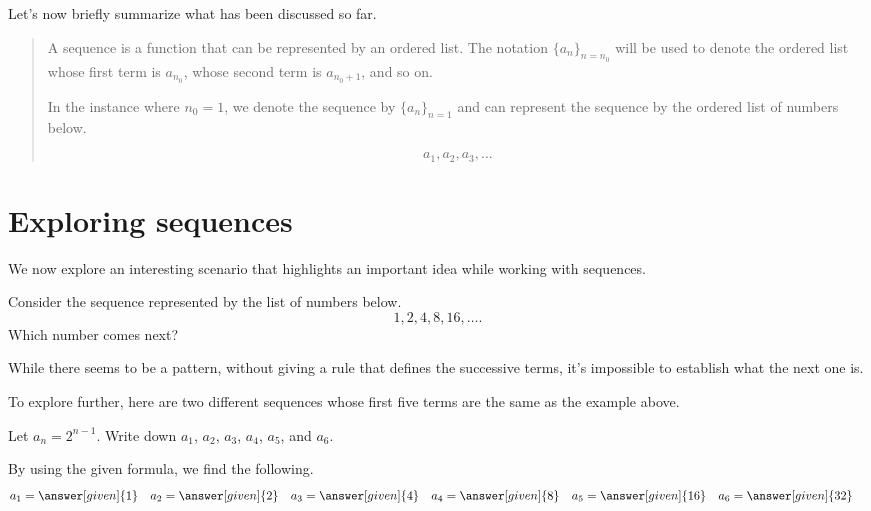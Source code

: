 \documentclass{ximera}
\begin{document}
Let's now briefly summarize what has been discussed so far.

\begin{quote}
A sequence is a function that can be represented by an ordered list.  The notation $\{a_n\}_{n=n_0}$ will be used to denote the ordered list whose first term is $a_{n_0}$, whose second term is $a_{n_0+1}$, and so on.  

In the instance where $n_0=1$, we denote the sequence by $\{a_n\}_{n=1}$ and can represent the sequence by the ordered list of numbers below.

\[
a_1, a_2, a_3, \ldots
\]
\end{quote}

\section{Exploring sequences}
We now explore an interesting scenario that highlights an important idea while working with sequences.

\begin{question}
  Consider the sequence represented by the list of numbers below.
  \[
  1, 2, 4, 8, 16, \dots.
  \]
Which number comes next? 

While there seems to be a pattern, without giving a rule that defines the successive terms, it's impossible to establish what the next one is. 

\end{question}

To explore further, here are two different sequences whose first five terms are the same as the example above.

\begin{example}
  Let $a_n = 2^{n-1}$.  Write down $a_1$, $a_2$, $a_3$, $a_4$, $a_5$, and
  $a_6$.
  \begin{explanation}
    By using the given formula, we find the following.
    \begin{align*}
      a_1 &= \answer[given]{1} & a_2 &= \answer[given]{2} & 
      a_3 &= \answer[given]{4} & 
      a_4 &= \answer[given]{8} & 
      a_5 &= \answer[given]{16} & 
      a_6 &= \answer[given]{32}
    \end{align*}
  \end{explanation}
\end{example}
\end{document}
